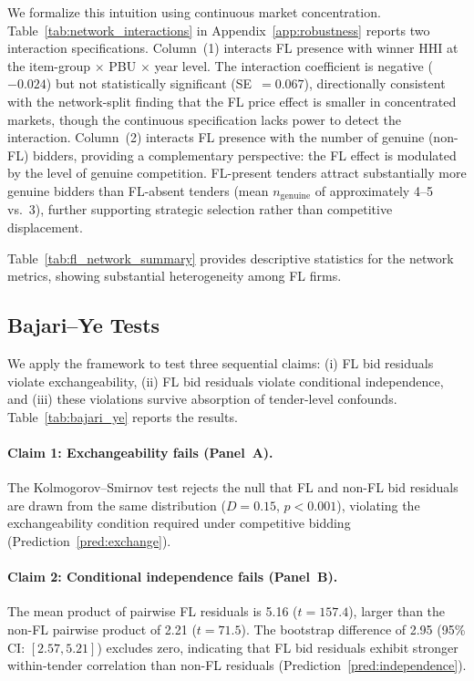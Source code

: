 We formalize this intuition using continuous market concentration.
Table~\ref{tab:network_interactions} in Appendix~\ref{app:robustness}
reports two interaction specifications. Column~(1) interacts FL presence
with winner HHI at the item-group $\times$ PBU $\times$ year level. The
interaction coefficient is negative ($-0.024$) but not statistically
significant (SE~$= 0.067$), directionally consistent with the
network-split finding that the FL price effect is smaller in concentrated
markets, though the continuous specification lacks power to detect the
interaction. Column~(2)
interacts FL presence with the number of genuine (non-FL) bidders,
providing a complementary perspective: the FL effect is modulated by the
level of genuine competition. FL-present tenders attract substantially
more genuine bidders than FL-absent tenders (mean $n_{\text{genuine}}$
of approximately 4--5 vs.\ 3), further supporting strategic selection
rather than competitive displacement.



Table~\ref{tab:fl_network_summary} provides descriptive statistics for
the network metrics, showing substantial heterogeneity among FL firms.



\subsection{Bajari--Ye Tests}
\label{sec:results_bajari}

We apply the \citet{bajari2003deciding} framework to test three
sequential claims: (i) FL bid residuals violate exchangeability,
(ii) FL bid residuals violate conditional independence, and
(iii) these violations survive absorption of tender-level confounds.
Table~\ref{tab:bajari_ye} reports the results.



\paragraph{Claim 1: Exchangeability fails (Panel~A).}
The Kolmogorov--Smirnov test rejects the null that FL and
non-FL bid residuals are drawn from the same distribution
($D = 0.15$, $p < 0.001$), violating the exchangeability condition
required under competitive bidding (Prediction~\ref{pred:exchange}).

\paragraph{Claim 2: Conditional independence fails (Panel~B).}
The mean product of pairwise FL residuals is 5.16 ($t = 157.4$),
larger than the non-FL pairwise product of 2.21 ($t = 71.5$). The
bootstrap difference of 2.95 (95\% CI: $[2.57, 5.21]$) excludes zero,
indicating that FL bid residuals exhibit stronger within-tender
correlation than non-FL residuals
(Prediction~\ref{pred:independence}).


